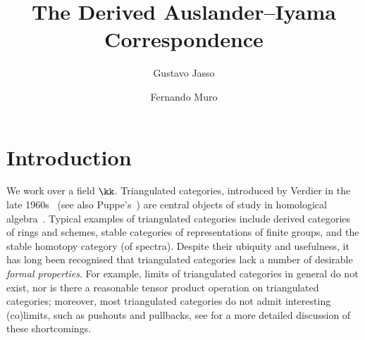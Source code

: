 \documentclass[a4paper]{amsart}
\title{The Derived Auslander--Iyama Correspondence}
\author[G.~Jasso]{Gustavo Jasso}%
\author[F.~Muro]{Fernando Muro}%
\begin{document}
\sloppy


\maketitle

\begin{abstract}
  
\end{abstract}

\setcounter{tocdepth}{1}
\tableofcontents


\section*{Introduction}

We work over a field $\kk$. Triangulated categories, introduced by Verdier in
the late 1960s~\cite{Ver96} (see also Puppe's~\cite{Pup62}) are central objects
of study in homological algebra~\cite{HJR10}. Typical examples of triangulated
categories include derived categories of rings and schemes, stable categories of
representations of finite groups, and the stable homotopy category (of spectra).
Despite their ubiquity and usefulness, it has long been recognised that
triangulated categories lack a number of desirable \emph{formal properties}. For
example, limits of triangulated categories in general do not exist, nor is there
a reasonable tensor product operation on triangulated categories; moreover, most
triangulated categories do not admit interesting (co)limits, such as pushouts
and pullbacks, see \cite[Sec.~2.2]{Toe11} for a more detailed discussion of
these shortcomings.
\end{document}
